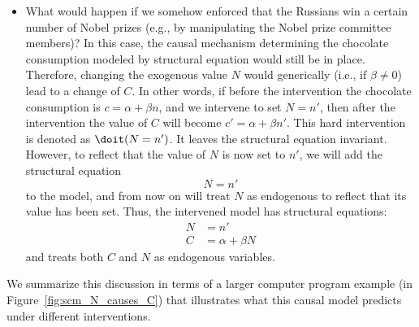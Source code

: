 \begin{itemize}
    The computer program equivalent of this intervention is to replace the line of code \texttt{C <- alpha + beta * N} with the assignment \texttt{C <- c}. If we consider $c$ to be a (constant) parameter, we get the following ``intervened'' program:
    \begin{lstlisting}
    N_causes_C.do_c <- function(N) {
      C <- c
      return(C)
    }
    \end{lstlisting}
  \item
    What would happen if we somehow enforced that the Russians win a certain number of Nobel prizes (e.g., by manipulating the Nobel prize committee members)?
    In this case, the causal mechanism determining the chocolate consumption modeled by structural equation  would still be in place. Therefore, changing the exogenous value $N$ would generically (i.e., if $\beta \ne 0$) lead to a change of $C$. In other words, if before the intervention the chocolate consumption is $c = \alpha + \beta n$, and we intervene to set $N=n'$, then after the intervention the value of $C$ will become $c' = \alpha + \beta n'$. This hard intervention is denoted as $\doit(N=n')$.
    It leaves the structural equation  invariant. However, to
    reflect that the value of $N$ is now set to $n'$, we will add the structural equation
    $$N = n'$$
    to the model, and from now on will treat $N$ as endogenous to reflect that its value has been set.
    Thus, the intervened model has structural equations:
    \begin{align*}
      N & = n' \\
      C & = \alpha + \beta N
    \end{align*}
    and treats both $C$ and $N$ as endogenous variables.
\end{itemize}
We summarize this discussion in terms of a larger computer program example (in Figure~\ref{fig:scm_N_causes_C}) that illustrates what this causal model predicts under different interventions.

